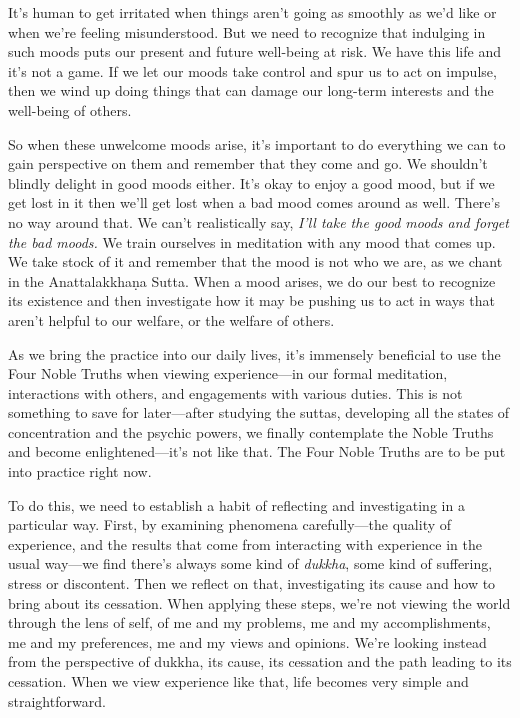 It's human to get irritated when things aren't going as smoothly as 
we'd like or when we're feeling misunderstood. But we need to recognize 
that indulging in such moods puts our present and future well-being at 
risk. We have this life and it's not a game. If we let our moods take 
control and spur us to act on impulse, then we wind up doing things 
that can damage our long-term interests and the well-being of others.

So when these unwelcome moods arise, it's important to do everything we 
can to gain perspective on them and remember that they come and go. We 
shouldn't blindly delight in good moods either. It's okay to enjoy a 
good mood, but if we get lost in it then we'll get lost when a bad mood 
comes around as well. There's no way around that. We can't 
realistically say, \emph{I'll take the good moods and forget the bad 
moods.} We train ourselves in meditation with any mood that comes up. 
We take stock of it and remember that the mood is not who we are, as we 
chant in the Anattalakkhaṇa Sutta. When a mood arises, we do our best 
to recognize its existence and then investigate how it may be pushing 
us to act in ways that aren't helpful to our welfare, or the welfare of 
others.


As we bring the practice into our daily lives, it's immensely 
beneficial to use the Four Noble Truths when viewing experience---in 
our formal meditation, interactions with others, and engagements with 
various duties. This is not something to save for later---after 
studying the suttas, developing all the states of concentration and the 
psychic powers, we finally contemplate the Noble Truths and become 
enlightened---it's not like that. The Four Noble Truths are to be put 
into practice right now.

To do this, we need to establish a habit of reflecting and 
investigating in a particular way. First, by examining phenomena 
carefully---the quality of experience, and the results that come from 
interacting with experience in the usual way---we find there's always 
some kind of \emph{dukkha}, some kind of suffering, stress or 
discontent. Then we reflect on that, investigating its cause and how to 
bring about its cessation. When applying these steps, we're not viewing 
the world through the lens of self, of me and my problems, me and my 
accomplishments, me and my preferences, me and my views and opinions. 
We're looking instead from the perspective of dukkha, its cause, its 
cessation and the path leading to its cessation. When we view 
experience like that, life becomes very simple and straightforward.


